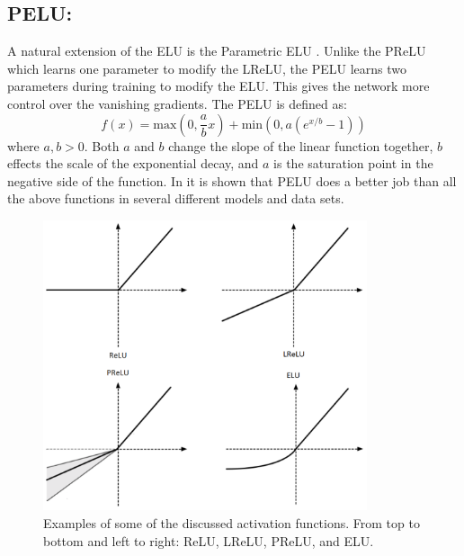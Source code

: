 \subsection{PELU:}
A natural extension of the ELU is the Parametric ELU \cite{trottier2016parametric}. 
Unlike the PReLU which learns one parameter to modify the LReLU, the PELU learns two parameters during training to modify the ELU. 
This gives the network more control over the vanishing gradients. 
The PELU is defined as:
\begin{equation}
f(x) = \mbox{max}(0,\frac{a}{b}x) + \mbox{min}(0,a(e^{x/b}-1))
\label{e:pelu}
\end{equation}
where $a,b > 0$. 
Both $a$ and $b$ change the slope of the linear function together, $b$ effects the scale of the exponential decay, and $a$ is the saturation point in the negative side of the function. 
In \cite{trottier2016parametric} it is shown that PELU does a better job than all the above functions in several different models and data sets.

\begin{figure}[h!]
	\centering
		\includegraphics[width=0.85\textwidth]{figures/activations.png}
	\caption{Examples of some of the discussed activation functions. From top to bottom and left to right: ReLU, LReLU, PReLU, and ELU.}
	\label{f:activations}
\end{figure}


